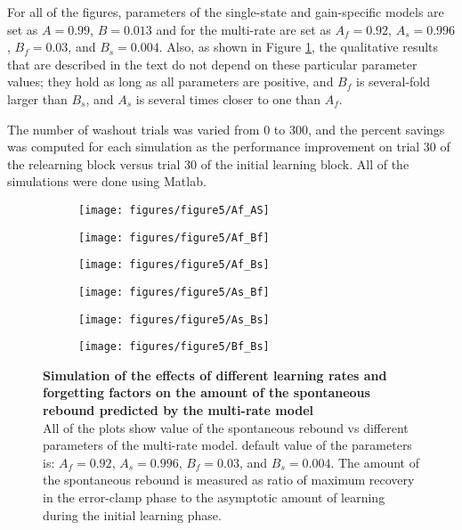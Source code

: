 \documentclass[9pt,twocolumn]{paper-template}
\begin{document}
For all of the figures, parameters of the single-state and gain-specific models are set as $A=0.99$, $B=0.013$ and for the multi-rate are set as $A_f = 0.92$, $A_s = 0.996$, $B_f = 0.03$, and $B_s = 0.004$. Also, as shown in Figure \ref{fig:mutli_rate_params}, the qualitative results that are described in the text do not depend on these particular parameter values; they hold as long as all parameters are positive, and $B_f$ is several-fold larger than $B_s$, and $A_s$ is several times closer to one than $A_f$.

The number of washout trials was varied from 0 to 300, and the percent savings was computed for each simulation as the performance improvement on trial 30 of the relearning block versus trial 30 of the initial learning block. All of the simulations were done using Matlab.

\begin{figure}[h!]
  \centering
  \begin{subfigure}[b]{0.32\linewidth}
    \texttt{[image: figures/figure5/Af\_AS]}
  \end{subfigure}
  \begin{subfigure}[b]{0.32\linewidth}
    \texttt{[image: figures/figure5/Af\_Bf]}
  \end{subfigure}
   \begin{subfigure}[b]{0.32\linewidth}
    \texttt{[image: figures/figure5/Af\_Bs]}
  \end{subfigure}
    \begin{subfigure}[b]{0.32\linewidth}
    \texttt{[image: figures/figure5/As\_Bf]}
  \end{subfigure}
  \begin{subfigure}[b]{0.32\linewidth}
    \texttt{[image: figures/figure5/As\_Bs]}
  \end{subfigure}
   \begin{subfigure}[b]{0.32\linewidth}
    \texttt{[image: figures/figure5/Bf\_Bs]}
  \end{subfigure}
  \caption{\textbf{Simulation of the effects of different learning rates and forgetting factors on the amount of the spontaneous rebound predicted by the multi-rate model}\\
  All of the plots show value of the spontaneous rebound vs different parameters of the multi-rate model. default value of the parameters is: $A_f=0.92$, $A_s=0.996$, $B_f=0.03$, and $B_s=0.004$. The amount of the spontaneous rebound is measured as ratio of maximum recovery in the error-clamp phase to the asymptotic amount of learning during the initial learning phase. 
}
  \label{fig:mutli_rate_params}
\end{figure}
\end{document}
